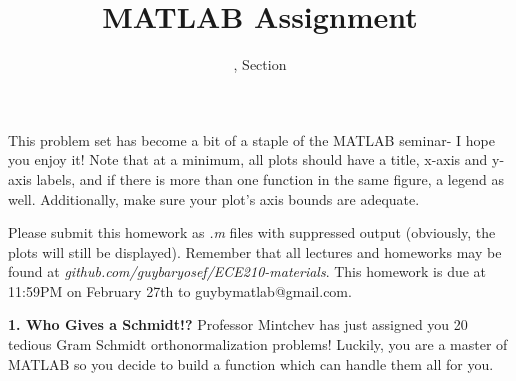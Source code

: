\documentclass[11pt]{article}
\title{MATLAB Assignment \Homework}
\author{\Session, Section \Section}
\date{}
\makeatletter
\def\MyEmail{guybymatlab@gmail.com}
\def\DateOfSubmission{February 27th }
\makeatother
\begin{document}
\maketitle
This problem set has become a bit of a staple of the MATLAB seminar- I hope you enjoy it!
Note that at a minimum, all plots should have a title, x-axis and y-axis labels,
and if there is more than one function in the same figure, a legend as well.
Additionally, make sure your plot's axis bounds are adequate. 

Please submit this homework as \textit{.m} files 
with suppressed output (obviously, the plots will still be displayed).
Remember that all lectures and homeworks may be found at 
\textit{github.com/guybaryosef/ECE210-materials}.
This homework is due at 11:59PM on \DateOfSubmission to \MyEmail. 

\noindent
\newline
\textbf{1. Who Gives a Schmidt!?}
Professor Mintchev has just assigned you 20 tedious Gram Schmidt orthonormalization problems!
Luckily, you are a master of MATLAB so you decide to build a function which can handle them all
for you.
\end{document}
